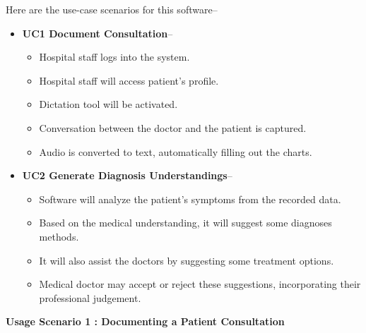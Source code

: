 \documentclass[12pt]{article}
\begin{document}
Here are the use-case scenarios for this software--

\begin{itemize}
  \item\textbf{UC1 Document Consultation}--
  \begin{itemize}
    \item{Hospital staff logs into the system.}
    \item{Hospital staff will access patient’s profile.}
    \item{Dictation tool will be activated.}
    \item{Conversation between the doctor and the patient is captured.}
    \item{Audio is converted to text, automatically filling out the charts.}
  \end{itemize}
  \item\textbf{UC2 Generate Diagnosis Understandings}--
  \begin{itemize}
    \item{Software will analyze the patient’s symptoms from the recorded data.}
    \item{Based on the medical understanding, it will suggest some diagnoses methods.}
    \item{It will also assist the doctors by suggesting some treatment options.}
    \item{Medical doctor may accept or reject these suggestions, incorporating their professional judgement.}
  \end{itemize}
\end{itemize}

\textbf{Usage Scenario 1 : Documenting a Patient Consultation}
\end{document}
